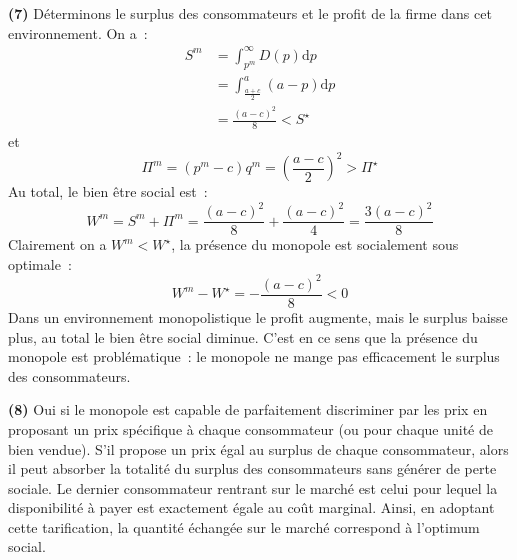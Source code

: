 \documentclass[10pt,a4paper,notitlepage,twocolumn]{article}
\newcommand{\question}[1]{\textbf{(#1)}}
\begin{document}
\question{7} Déterminons le surplus des consommateurs et le profit de la
firme dans cet environnement. On a~:
\[
  \begin{split}
    S^m &= \int_{p^m}^\infty D(p)\mathrm dp\\
            &= \int_{\frac{a+c}{2}}^a (a-p)\mathrm dp\\
            &= \frac{(a-c)^2}{8} < S^\star
  \end{split}
\]
et
\[
\Pi^m = (p^m-c)q^m = \left(\frac{a-c}{2}\right)^2>\Pi^\star
\]
Au total, le bien être social est~:
\[
W^m = S^m+\Pi^m = \frac{(a-c)^2}{8} + \frac{(a-c)^2}{4} = \frac{3(a-c)^2}{8}
\]
Clairement on a $W^m<W^\star$, la présence du monopole est socialement sous optimale~:
\[
W^m - W^\star = -\frac{(a-c)^2}{8}<0 
\]
Dans un environnement monopolistique le profit augmente, mais le
surplus baisse plus, au total le bien être social diminue. C'est en ce
sens que la présence du monopole est problématique~: le monopole ne
mange pas efficacement le surplus des consommateurs.\newline

\question{8} Oui si le monopole est capable de parfaitement
discriminer par les prix en proposant un prix spécifique à chaque
consommateur (ou pour chaque unité de bien vendue). S'il propose un
prix égal au surplus de chaque consommateur, alors il peut absorber la
totalité du surplus des consommateurs sans générer de perte
sociale. Le dernier consommateur rentrant sur le marché est celui pour
lequel la disponibilité à payer est exactement égale au coût
marginal. Ainsi, en adoptant cette tarification, la quantité échangée
sur le marché correspond à l'optimum social.
\end{document}
